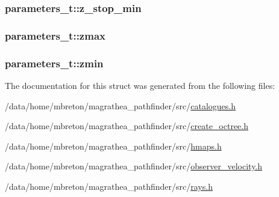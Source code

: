 \hypertarget{structparameters__t_a4eee94929742ddf7fd98bf7b7d51eecd}{
\subsubsection[{z\-\_\-stop\-\_\-min}]{ parameters\-\_\-t\-::z\-\_\-stop\-\_\-min}}\label{structparameters__t_a4eee94929742ddf7fd98bf7b7d51eecd}
\hypertarget{structparameters__t_ae5763714b90e179cce44fef50a461be9}{
\subsubsection[{zmax}]{ parameters\-\_\-t\-::zmax}}\label{structparameters__t_ae5763714b90e179cce44fef50a461be9}
\hypertarget{structparameters__t_a799da534b80a8c4d4c4bbfa70defcfdd}{
\subsubsection[{zmin}]{ parameters\-\_\-t\-::zmin}}\label{structparameters__t_a799da534b80a8c4d4c4bbfa70defcfdd}


The documentation for this struct was generated from the following files\-:\begin{DoxyCompactItemize}
\item 
/data/home/mbreton/magrathea\-\_\-pathfinder/src/\hyperlink{catalogues_8h}{catalogues.\-h}\item 
/data/home/mbreton/magrathea\-\_\-pathfinder/src/\hyperlink{create__octree_8h}{create\-\_\-octree.\-h}\item 
/data/home/mbreton/magrathea\-\_\-pathfinder/src/\hyperlink{hmaps_8h}{hmaps.\-h}\item 
/data/home/mbreton/magrathea\-\_\-pathfinder/src/\hyperlink{observer__velocity_8h}{observer\-\_\-velocity.\-h}\item 
/data/home/mbreton/magrathea\-\_\-pathfinder/src/\hyperlink{rays_8h}{rays.\-h}\end{DoxyCompactItemize}

